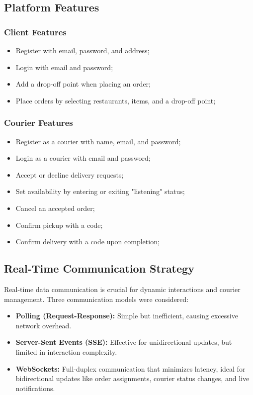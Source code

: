 \subsection{Platform Features}

\subsubsection{Client Features}
\begin{itemize}
    \item Register with email, password, and address;
    \item Login with email and password;
    \item Add a drop-off point when placing an order;
    \item Place orders by selecting restaurants, items, and a drop-off point;
\end{itemize}

\subsubsection{Courier Features}
\begin{itemize}
    \item Register as a courier with name, email, and password;
    \item Login as a courier with email and password;
    \item Accept or decline delivery requests;
    \item Set availability by entering or exiting "listening" status;
    \item Cancel an accepted order;
    \item Confirm pickup with a code;
    \item Confirm delivery with a code upon completion;
\end{itemize}

\subsection{Real-Time Communication Strategy}

Real-time data communication is crucial for dynamic interactions and courier management. Three communication models were considered:

\begin{itemize}
    \item \textbf{Polling (Request-Response):} Simple but inefficient, causing excessive network overhead.
    \item \textbf{Server-Sent Events (SSE):} Effective for unidirectional updates, but limited in interaction complexity.
    \item \textbf{WebSockets:} Full-duplex communication that minimizes latency, ideal for bidirectional updates like order assignments, courier status changes, and live notifications.
\end{itemize}

